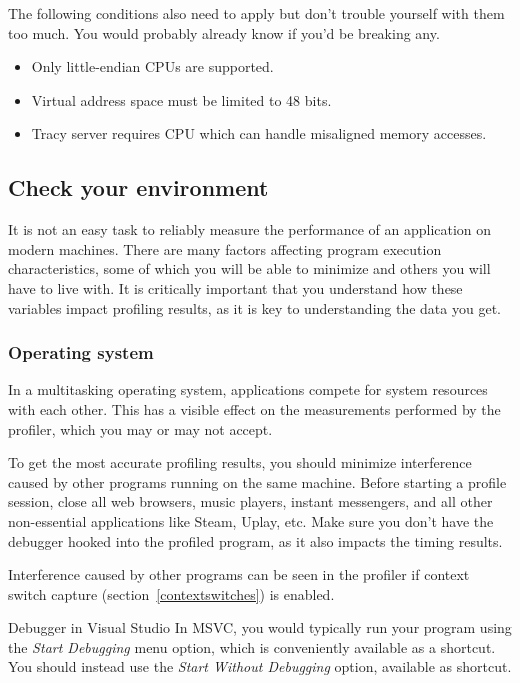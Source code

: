 \documentclass[hidelinks,titlepage,a4paper]{article}
\begin{document}
The following conditions also need to apply but don't trouble yourself with them too much. You would probably already know if you'd be breaking any.

\begin{itemize}
\item Only little-endian CPUs are supported.
\item Virtual address space must be limited to 48 bits.
\item Tracy server requires CPU which can handle misaligned memory accesses.
\end{itemize}

\subsection{Check your environment}

It is not an easy task to reliably measure the performance of an application on modern machines. There are many factors affecting program execution characteristics, some of which you will be able to minimize and others you will have to live with. It is critically important that you understand how these variables impact profiling results, as it is key to understanding the data you get.

\subsubsection{Operating system}
\label{checkenvironmentos}

In a multitasking operating system, applications compete for system resources with each other. This has a visible effect on the measurements performed by the profiler, which you may or may not accept.

To get the most accurate profiling results, you should minimize interference caused by other programs running on the same machine. Before starting a profile session, close all web browsers, music players, instant messengers, and all other non-essential applications like Steam, Uplay, etc. Make sure you don't have the debugger hooked into the profiled program, as it also impacts the timing results.

Interference caused by other programs can be seen in the profiler if context switch capture (section~\ref{contextswitches}) is enabled.

\begin{bclogo}[
noborder=true,
couleur=black!5,
logo=\bclampe
]{Debugger in Visual Studio}
In MSVC, you would typically run your program using the \emph{Start Debugging} menu option, which is conveniently available as a  shortcut. You should instead use the \emph{Start Without Debugging} option, available as  shortcut.
\end{bclogo}
\end{document}
